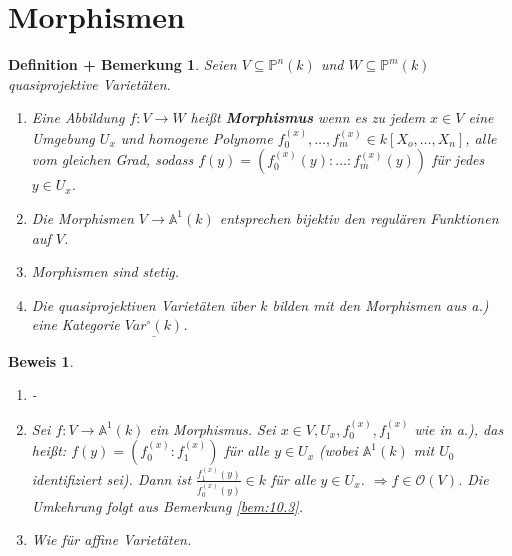 \documentclass[a4paper,12pt]{report}
\theoremstyle{break}
\newtheorem{DefBem}[Def]{Definition + Bemerkung}
\theoremstyle{nonumberbreak}
\theoremstyle{nonumberplain}
\newtheorem{Bew}{Beweis}
\newcommand{\emp}[1]{\textbf{\emph{#1}}}
\newcommand{\begriff}[1]{{\index{#1}}\emp{#1}}
\begin{document}
\section{Morphismen}
\begin{DefBem}
  \label{defbem:11.1}
  Seien $V\subseteq \mathbb P^n(k)$ und $W\subseteq \mathbb P^m(k)$ quasiprojektive Varietäten.
  \begin{enumerate}
  \item Eine Abbildung $f:V\longrightarrow W$ heißt \begriff{Morphismus} wenn es zu jedem $x\in V$ eine Umgebung $U_x$ und homogene 
    Polynome $f_0^{(x)},\dots,f_m^{(x)}\in k[X_o,\dots,X_n]$, alle vom gleichen Grad, sodass $f(y)=\left(f_0^{(x)}(y):\dots:f_m^{(x)}(y)\right)$
    für jedes $y\in U_x$.
  \item Die Morphismen $V\longrightarrow \mathbb A^1(k)$ entsprechen bijektiv den regulären Funktionen auf $V$.
  \item Morphismen sind stetig.
  \item Die quasiprojektiven Varietäten über $k$ bilden mit den Morphismen aus a.) eine Kategorie $\underline{Var^\circ(k)}$.
  \end{enumerate}
\end{DefBem}
\begin{Bew}
  \begin{enumerate}
  \item -
  \item Sei $f:V\longrightarrow\mathbb A^1(k)$ ein Morphismus. Sei $x\in V, U_x, f_0^{(x)},f_1^{(x)}$ wie in a.), das heißt: 
    $f(y)=\left(f_0^{(x)}:f_1^{(x)}\right)$ für alle $y\in U_x$ (wobei $\mathbb A^1(k)$ mit $U_0$ identifiziert sei).
    Dann ist $\frac{f_1^{(x)}(y)}{f_0^{(x)}(y)}\in k$ für alle $y\in U_x$. $\Rightarrow f\in \mathcal O(V)$. 
    Die Umkehrung folgt aus Bemerkung \ref{bem:10.3}.
  \item Wie für affine Varietäten.
  \end{enumerate}
\end{Bew}
\end{document}
